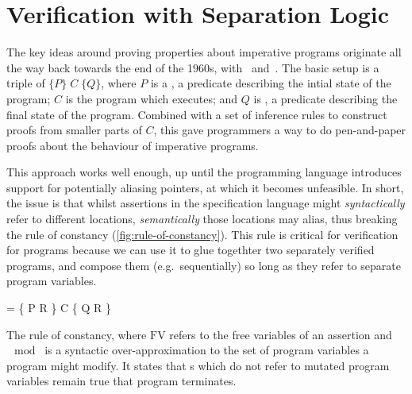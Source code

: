 \section{Verification with Separation Logic}\label{sec:sep-logic-intro}

The key ideas around proving properties about imperative programs originate all
the way back towards the end of the 1960s, with~\citeauthor{floyd1993assigning}
and~\citeauthor{hoare1969axiomatic}. The basic setup is a triple of
$\{P\} \;C \; \{Q\}$, where $P$ is a , a predicate describing the
intial state of the program; $C$ is the program which executes; and $Q$ is
, a predicate describing the final state of the program.
Combined with a set of inference rules to construct proofs from smaller parts
of $C$, this gave programmers a way to do pen-and-paper proofs about the
behaviour of imperative programs.

This approach works well enough, up until the programming language introduces
support for potentially aliasing pointers, at which it becomes
unfeasible. In short, the issue is that
whilst assertions in the specification language might \emph{syntactically}
refer to different locations, \emph{semantically} those locations may alias,
thus breaking the rule of constancy (\cref{fig:rule-of-constancy}). This rule
is critical for  verification for programs because we can use it
to glue togethter two separately verified programs, and compose them (e.g.\
sequentially) so long as they refer to separate program variables.

\begin{marginfigure}
  \begin{mathpar}
       = \emptyset{}
                {\vdash{} \{ P \wedge{} R \} \; C \; \{ Q \wedge{} R \}}
  \end{mathpar}
  \caption{The rule of constancy, where $\mathrm{FV}$ refers to the free
      variables of an assertion and $\mod{}$ is a syntactic
      over-approximation to the set of program variables a program might
      modify. It states that \kl{precondition}s which do not refer to mutated
      program variables remain true that program terminates.}\label{fig:rule-of-constancy}
\end{marginfigure}

